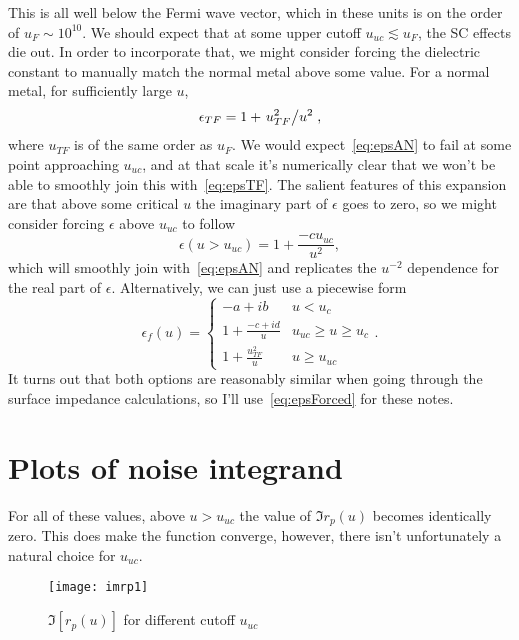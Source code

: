 \documentclass[../main.tex]{subfiles}
\begin{document}
	This is all well below the Fermi wave vector, which in these units is on the order of $u_F \sim 10^{10}$.
	We should expect that at some upper cutoff $u_{uc} \lesssim u_F$, the SC effects die out.
	In order to incorporate that, we might consider forcing the dielectric constant to manually match the normal metal above some value.
	For a normal metal, for sufficiently large $u$,
	\begin{equation}
		\epsilon_{TF} = 1 + \flatfrac{u_{TF}^2}{u^2} \label{eq:epsTF},
	\end{equation}
	where $u_{TF}$ is of the same order as $u_F$.
	We would expect~\eqref{eq:epsAN} to fail at some point approaching $u_{uc}$, and at that scale it's numerically clear that we won't be able to smoothly join this with~\eqref{eq:epsTF}.
	The salient features of this expansion are that above some critical $u$ the imaginary part of $\epsilon$ goes to zero, so we might consider forcing $\epsilon$ above $u_{uc}$ to follow
	\begin{equation}
		\epsilon(u > u_{uc}) = 1 + \frac{-c u_{uc}}{u^2}, \label{eq:epsSmoothJoin}
	\end{equation}
	which will smoothly join with~\eqref{eq:epsAN} and replicates the $u^{-2}$ dependence for the real part of $\epsilon$.
	Alternatively, we can just use a piecewise form
	\begin{equation}
		\epsilon_f(u) =
		\begin{cases}
			-a + i b & u < u_c \\
			1 + \frac{-c + i d}{u} &  u_{uc} \geq u \geq u_c \\
			1 + \frac{u_{TF}^2}{u} &  u \geq u_{uc}
		\end{cases}. \label{eq:epsForced}
	\end{equation}
	It turns out that both options are reasonably similar when going through the surface impedance calculations, so I'll use~\eqref{eq:epsForced} for these notes.

	\section{Plots of noise integrand} \label{sec:plotsdiscussion}

	For all of these values, above $u > u_{uc}$ the value of $\Im r_p(u)$ becomes identically zero.
	This does make the function converge, however, there isn't unfortunately a natural choice for $u_{uc}$.
	\begin{figure}[htp]
		\centering
		\texttt{[image: imrp1]}
		\caption{$\Im[r_p(u)]$ for different cutoff $u_{uc}$} \label{fig:imrpVsCutoff}
	\end{figure}
\end{document}
